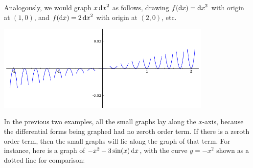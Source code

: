 Analogously, we would graph $x\,{\mathrm{d} x}^2$ as follows, drawing $f({\mathrm{d} x}) = {\mathrm{d} x}^2$ with origin at $(1,0)$, and $f({\mathrm{d} x})=2\,{\mathrm{d} x}^2$ with origin at $(2,0)$, etc.
\begin{center}
  \includegraphics[width=0.8\textwidth]{x-dx2.png}
\end{center}
In the previous two examples, all the small graphs lay along the $x$-axis, because the differential forms being graphed had no zeroth order term.
If there is a zeroth order term, then the small graphs will lie along the graph of that term.
For instance, here is a graph of $-x^2 + 3\sin(x)\,{\mathrm{d} x}$, with the curve $y=-x^2$ shown as a dotted line for comparison:
